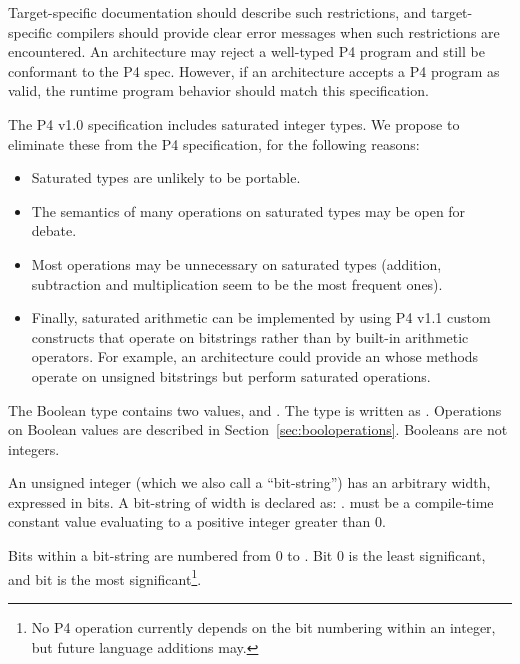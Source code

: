 \documentclass[12pt]{article}
\begin{document}
Target-specific documentation should describe such restrictions, and
target-specific compilers should provide clear error messages when
such restrictions are encountered.  An architecture may reject a
well-typed P4 program and still be conformant to the P4 spec.
However, if an architecture accepts a P4 program as valid, the runtime
program behavior should match this specification.


The P4 v1.0 specification includes saturated integer types.  We
propose to eliminate these from the P4 specification, for the following
reasons:

\begin{itemize}
\item Saturated types are unlikely to be portable.
\item The semantics of many operations on saturated types may be open
  for debate.
\item Most operations may be unnecessary on saturated types (addition,
  subtraction and multiplication seem to be the most frequent ones).
\item Finally, saturated arithmetic can be implemented by using P4
  v1.1  custom constructs that operate on bitstrings
  rather than by built-in arithmetic operators.  For example, an
  architecture could provide an  whose
  methods operate on unsigned bitstrings but perform saturated
  operations.
\end{itemize}


The Boolean type contains two values,  and
.  The type is written as \bool.  Operations on
Boolean values are described in Section~\ref{sec:booloperations}.
Booleans are not integers.


An unsigned integer (which we also call a ``bit-string'') has an
arbitrary width, expressed in bits.  A bit-string of width \W{} is
declared as: \bit{\W}.  \W{} must be a compile-time constant value
evaluating to a positive integer greater than 0.

Bits within a bit-string are numbered from 0 to .  Bit 0 is the
least significant, and bit  is the most significant\footnote{No P4
  operation currently depends on the bit numbering within an integer,
  but future language additions may.}.
\end{document}

